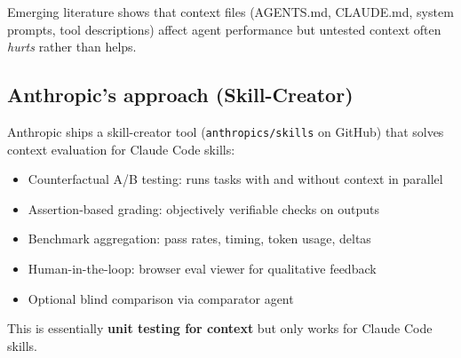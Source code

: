 Emerging literature shows that context files (AGENTS.md, CLAUDE.md, system prompts, tool descriptions) affect agent performance but untested context often \emph{hurts} rather than helps.

\subsection{Anthropic's approach (Skill-Creator)}

Anthropic ships a skill-creator tool (\texttt{anthropics/skills} on GitHub) that solves context evaluation for Claude Code skills:
\begin{itemize}
    \item Counterfactual A/B testing: runs tasks with and without context in parallel
    \item Assertion-based grading: objectively verifiable checks on outputs
    \item Benchmark aggregation: pass rates, timing, token usage, deltas
    \item Human-in-the-loop: browser eval viewer for qualitative feedback
    \item Optional blind comparison via comparator agent
\end{itemize}
This is essentially \textbf{unit testing for context} but only works for Claude Code skills.

